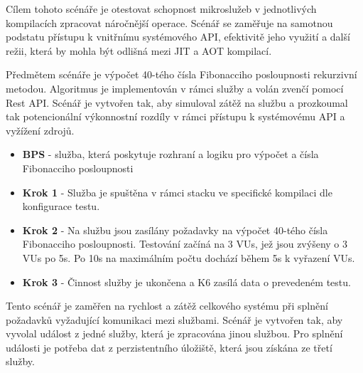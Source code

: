 
Cílem tohoto scénáře je otestovat schopnost mikroslužeb v jednotlivých kompilacích zpracovat náročnější operace. Scénář se zaměřuje na samotnou podstatu přístupu k vnitřnímu systémového API, efektivitě jeho využití a další režii, která by mohla být odlišná mezi JIT a AOT kompilací.

Předmětem scénáře je výpočet 40-tého čísla Fibonacciho posloupnosti rekurzivní metodou. Algoritmus je implementován v rámci služby a volán zvenčí pomocí Rest API. Scénář je vytvořen tak, aby simuloval zátěž na službu a prozkoumal tak potencionální výkonnostní rozdíly v rámci přístupu k systémovému API a vyžížení zdrojů.



\begin{itemize}
    \item \textbf{BPS} - služba, která poskytuje rozhraní a logiku pro výpočet a čísla Fibonacciho posloupnosti
\end{itemize}


\begin{itemize}
    \item \textbf{Krok 1} - Služba je spuštěna v rámci stacku ve specifické kompilaci dle konfigurace testu.
    \item \textbf{Krok 2} - Na službu jsou zasílány požadavky na výpočet 40-tého čísla Fibonacciho posloupnosti. Testování začíná na 3 VUs, jež jsou zvýšeny o 3 VUs po 5s. Po 10s na maximálním počtu dochází během 5s k vyřazení VUs.
    \item \textbf{Krok 3} - Činnost služby je ukončena a K6 zasílá data o prevedeném testu.
\end{itemize}


Tento scénář je zaměřen na rychlost a zátěž celkového systému při splnění požadavků vyžadující komunikaci mezi službami. Scénář je vytvořen tak, aby vyvolal událost z jedné služby, která je zpracována jinou službou. Pro splnění události je potřeba dat z perzistentního úložiště, která jsou získána ze třetí služby.



